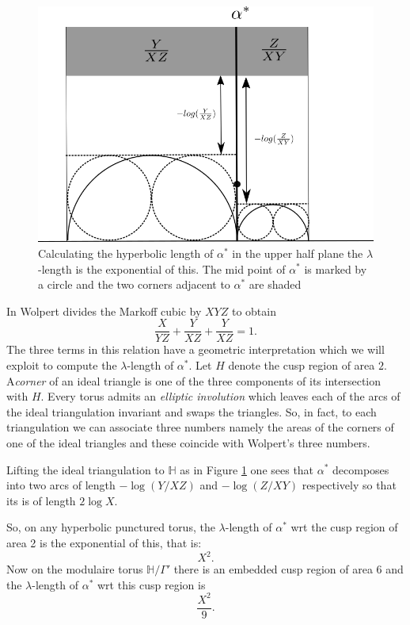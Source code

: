 \documentclass[12pt,a4paper]{amsart}
\def\HH{\mathbb{H}}
\begin{document}
  \begin{figure}[ht]
\begin{center}
\includegraphics[scale=.5]{shear.png} 
\end{center}
\caption{Calculating the hyperbolic length of $\alpha^*$ in the upper half plane
the $\lambda$-length is the exponential of this.
The mid point of $\alpha^*$ is marked by a circle and
the two corners adjacent to $\alpha^*$ are shaded}
\label{penner}
\end{figure}

In  \cite{saw} Wolpert divides the Markoff cubic by $XYZ$ to obtain
$$\frac{X}{YZ} + \frac{Y}{XZ} + \frac{Y}{XZ} = 1.$$
The three terms in this relation have a geometric interpretation
which we will exploit to compute the $\lambda$-length of $\alpha^*$.
Let $H$ denote the cusp region of area $2$. 
A\textit{corner} of an ideal triangle is one of the 
three components of its intersection with $H$.
Every torus admits an \textit{elliptic involution}
which leaves each of the arcs of the ideal triangulation  invariant
 and swaps the triangles.
So, in fact, to each triangulation we can associate three numbers
namely the areas of the corners of one of the  ideal triangles
and these coincide with Wolpert's three numbers.

Lifting the ideal triangulation to $\HH$ as in Figure \ref{penner}
one sees that  $\alpha^*$ decomposes into two arcs of length
$-\log(Y/XZ)$ and $-\log(Z/XY)$ respectively
so that its is of length $2\log X$.

So, on any hyperbolic punctured torus,
the $\lambda$-length of $\alpha^*$ wrt the cusp region of area 2 is
the exponential of this, that is:
$$ X^2.$$
Now on the modulaire torus $\HH/\Gamma'$ there is an embedded cusp 
region of area 6 and the $\lambda$-length of $\alpha^*$ wrt this cusp region
is
$$ \frac{X^2}{9}.$$
\end{document}
